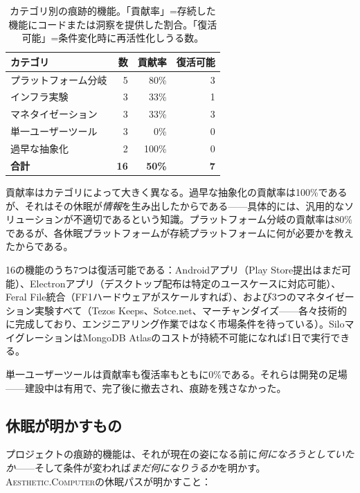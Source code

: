 \documentclass[10pt,letterpaper,twocolumn]{article}
\newcommand{\ac}{\textsc{Aesthetic.Computer}}
\begin{document}
\begin{table}[h]
\small
\centering
\begin{tabularx}{\columnwidth}{Xrrr}
\toprule
\textbf{カテゴリ} & \textbf{数} & \textbf{貢献率} & \textbf{復活可能} \\
\midrule
プラットフォーム分岐 & 5 & 80\% & 3 \\
インフラ実験 & 3 & 33\% & 1 \\
マネタイゼーション & 3 & 33\% & 3 \\
単一ユーザーツール & 3 & 0\% & 0 \\
過早な抽象化 & 2 & 100\% & 0 \\
\midrule
\textbf{合計} & \textbf{16} & \textbf{50\%} & \textbf{7} \\
\bottomrule
\end{tabularx}
\caption{カテゴリ別の痕跡的機能。「貢献率」=存続した機能にコードまたは洞察を提供した割合。「復活可能」=条件変化時に再活性化しうる数。}
\label{tab:vestigial}
\end{table}

貢献率はカテゴリによって大きく異なる。過早な抽象化の貢献率は100\%であるが、それはその休眠が\emph{情報}を生み出したからである——具体的には、汎用的なソリューションが不適切であるという知識。プラットフォーム分岐の貢献率は80\%であるが、各休眠プラットフォームが存続プラットフォームに何が必要かを教えたからである。

16の機能のうち7つは復活可能である：Androidアプリ（Play Store提出はまだ可能）、Electronアプリ（デスクトップ配布は特定のユースケースに対応可能）、Feral File統合（FF1ハードウェアがスケールすれば）、および3つのマネタイゼーション実験すべて（Tezos Keeps、Sotce.net、マーチャンダイズ——各々技術的に完成しており、エンジニアリング作業ではなく市場条件を待っている）。SiloマイグレーションはMongoDB Atlasのコストが持続不可能になれば1日で実行できる。

単一ユーザーツールは貢献率も復活率もともに0\%である。それらは開発の足場——建設中は有用で、完了後に撤去され、痕跡を残さなかった。

\subsection{休眠が明かすもの}

プロジェクトの痕跡的機能は、それが現在の姿になる前に\emph{何になろうとしていたか}——そして条件が変われば\emph{まだ何になりうるか}を明かす。\ac{}の休眠パスが明かすこと：
\end{document}
